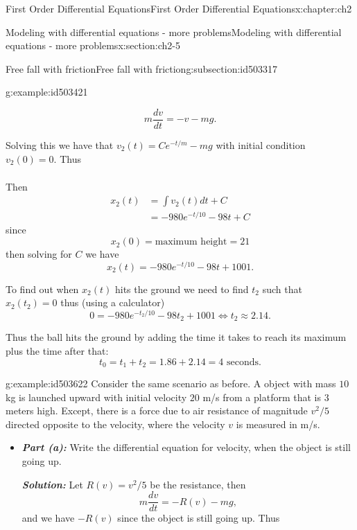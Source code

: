 \documentclass[oneside,10pt,]{book}
\newcommand{\alert}[1]{\textbf{\textit{#1}}}
\numberwithin{equation}{section}
\numberwithin{equation}{section}
\newcommand{\amp}{&}
\begin{document}
\begin{chapterptx}{First Order Differential Equations}{}{First Order Differential Equations}{}{}{x:chapter:ch2}
\begin{sectionptx}{Modeling with differential equations - more problems}{}{Modeling with differential equations - more problems}{}{}{x:section:ch2-5}
\begin{subsectionptx}{Free fall with friction}{}{Free fall with friction}{}{}{g:subsection:id503317}
\begin{example}{}{g:example:id503421}
\begin{itemize}[label=\textbullet]
\begin{equation*}
m\frac{dv}{dt}=-v-mg.
\end{equation*}
%
\par
Solving this we have that \(v_{2}(t)=Ce^{-t/m}-mg\) with initial condition \(v_{2}(0)=0\). Thus%
\begin{align*}
\end{align*}
%
\par
Then%
\begin{align*}
x_{2}(t) \amp =\int v_{2}(t)dt+C\\
\amp =-980e^{-t/10}-98t+C
\end{align*}
since%
\begin{equation*}
x_{2}(0)=\text{maximum height}=21
\end{equation*}
then solving for \(C\) we have%
\begin{equation*}
x_{2}(t)=-980e^{-t/10}-98t+1001.
\end{equation*}
%
\par
To find out when \(x_{2}(t)\) hits the ground we need to find \(t_{2}\) such that \(x_{2}(t_{2})=0\) thus (using a calculator)%
\begin{equation*}
0=-980e^{-t_{2}/10}-98t_{2}+1001\iff t_{2}\approx2.14.
\end{equation*}
%
\par
Thus the ball hits the ground by adding the time it takes to reach its maximum plus the time after that:%
\begin{equation*}
t_{0}=t_{1}+t_{2}=1.86+2.14=4\text{ seconds}.
\end{equation*}
%
\end{itemize}
\end{example}
\begin{example}{}{g:example:id503622}%
Consider the same scenario as before. A object with mass \(10\) kg is launched upward with initial velocity \(20\) m\slash{}s from a platform that is \(3\) meters high. Except, there is a force due to air resistance of magnitude \(v^{2}/5\) directed opposite to the velocity, where the velocity \(v\) is measured in m\slash{}s.%
%
\begin{itemize}[label=\textbullet]
\item{}\alert{Part (a):} Write the differential equation for velocity, when the object is still going up.%
\par
\alert{Solution:} Let \(R(v)=v^{2}/5\) be the resistance, then%
\begin{equation*}
m\frac{dv}{dt}=-R(v)-mg,
\end{equation*}
and we have \(-R(v)\) since the object is still going up. Thus%

\end{itemize}
\end{example}
\end{subsectionptx}
\end{sectionptx}
\end{chapterptx}
\end{document}
